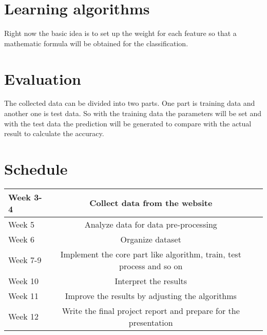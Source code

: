 \documentclass[14pt]{article}
\begin{document}
\section{Learning algorithms}
Right now the basic idea is to set up the weight for each feature so that a mathematic formula will be obtained for the classification.
\section{Evaluation}
The collected data can be divided into two parts. One part is training data and another one is test data. So with the training data the parameters will be set and with the test data the prediction will be generated to compare with the actual result to calculate the accuracy.
\section{Schedule}
\begin{center}
  \begin{tabular}{ | l | c | r |}
    \hline
    Week 3-4 & Collect data from the website &  \\ \hline
    Week 5 & Analyze data for data pre-processing &  \\ \hline
    Week 6 & Organize dataset &  \\ \hline 
    Week 7-9 & Implement the core part like algorithm, train, test process and so on &  \\ \hline 
    Week 10 & Interpret the results &  \\ \hline 
    Week 11 & Improve the results by adjusting the algorithms &  \\ \hline 
    Week 12 & Write the final project report and prepare for the presentation &  \\
    \hline
  \end{tabular}
\end{center}
\end{document}

